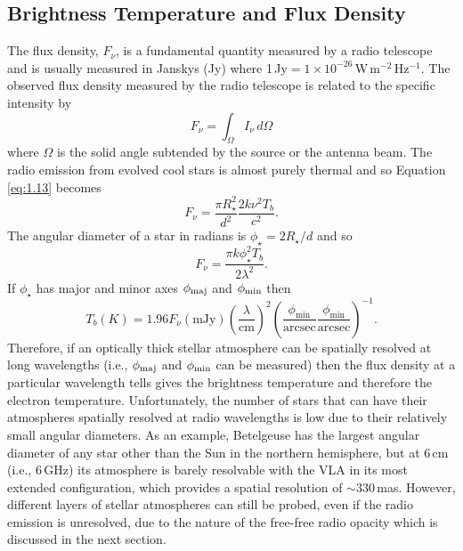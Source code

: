 \subsection{Brightness Temperature and Flux Density}\label{sec:1.8.2}
The flux density, $F_{\nu}$, is a fundamental quantity measured by a radio telescope and is usually measured in Janskys (Jy) where 1\,Jy$ = 1\times 10^{-26}$\,W\,m$^{-2}$\,Hz$^{-1}$. The observed flux density measured by the radio telescope is related to the specific intensity by
\begin{equation}\label{eq:1.13}
F_{\nu} = \int _{\Omega} I_{\nu}\,d\Omega
\end{equation}
where $\Omega$ is the solid angle subtended by the source or the antenna beam. The radio emission from evolved cool stars is almost purely thermal and so Equation \ref{eq:1.13} becomes 
\begin{equation}
F_{\nu} =  \frac{\pi R_{\star}^2}{d^2}\frac{2k\nu ^2T_{b}}{c^2}.
\end{equation}
The angular diameter of a star in radians is $\phi _{\star}=2R_{\star}/d$ and so
\begin{equation}
F_{\nu}=\frac{\pi k\phi _{\star}^2 T_b}{2\lambda ^2}.
\end{equation}
If $\phi _{\star}$ has major and minor axes $\phi _{\rm{maj}}$ and $\phi _{\rm{min}}$ then
\begin{equation}
T_{b} (K)=1.96F_{\nu}(\mathrm{mJy})\left(\frac{\lambda}{\mathrm{cm}}\right)^2\left(\frac{\phi _{\mathrm{min}}}{\mathrm{arcsec}} \frac{\phi _{\mathrm{min}}}{\mathrm{arcsec}}\right)^{-1}.
\end{equation}
Therefore, if an optically thick stellar atmosphere can be spatially resolved at long wavelengths (i.e., $\phi _{\rm{maj}}$ and $\phi _{\rm{min}}$ can be measured) then the flux density at a particular wavelength tells gives the brightness temperature and therefore the electron temperature. Unfortunately, the number of stars that can have their atmospheres spatially resolved at radio wavelengths is low due to their relatively small angular diameters. As an example, Betelgeuse has the largest angular diameter of any star other than the Sun in the northern hemisphere, but at 6\,cm (i.e., 6\,GHz) its atmosphere is barely resolvable with the VLA in its most extended configuration, which provides a spatial resolution of $\sim 330$\,mas. However, different layers of stellar atmospheres can still be probed, even if the radio emission is unresolved, due to the nature of the free-free radio opacity which is discussed in the next section.

